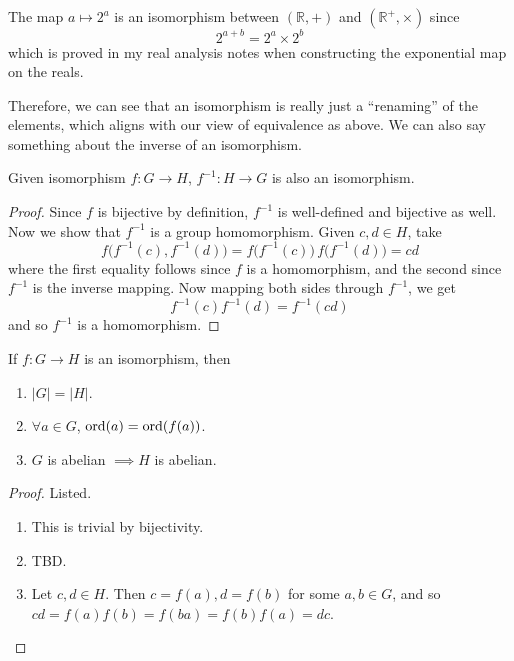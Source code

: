   \begin{example}
    The map $a \mapsto 2^{a}$ is an isomorphism between $(\mathbb{R}, +)$ and $(\mathbb{R}^{+}, \times)$ since 
    \begin{equation}
      2^{a+b} = 2^a \times 2^b
    \end{equation} 
    which is proved in my real analysis notes when constructing the exponential map on the reals. 
  \end{example} 

  Therefore, we can see that an isomorphism is really just a ``renaming'' of the elements, which aligns with our view of equivalence as above. We can also say something about the inverse of an isomorphism. 

  \begin{theorem}
    Given isomorphism $f: G \rightarrow H$, $f^{-1}: H \rightarrow G$ is also an isomorphism. 
  \end{theorem}
  \begin{proof}
    Since $f$ is bijective by definition, $f^{-1}$ is well-defined and bijective as well. Now we show that $f^{-1}$ is a group homomorphism. Given $c, d \in H$, take 
    \begin{equation}
      f \big( f^{-1} (c), f^{-1} (d)\big) = f \big( f^{-1} (c) \big) \, f \big( f^{-1} (d) \big) = cd 
    \end{equation}
    where the first equality follows since $f$ is a homomorphism, and the second since $f^{-1}$ is the inverse mapping. Now mapping both sides through $f^{-1}$, we get 
    \begin{equation}
      f^{-1} (c) f^{-1} (d) = f^{-1} (cd)
    \end{equation}
    and so $f^{-1}$ is a homomorphism. 
  \end{proof} 

  \begin{theorem}
    If $f: G \rightarrow H$ is an isomorphism, then 
    \begin{enumerate}
      \item $|G| = |H|$.
      \item $\forall a \in G$, $\ord(a) = \ord(f(a))$. 
      \item $G$ is abelian $\implies H$ is abelian. 
    \end{enumerate} 
  \end{theorem}
  \begin{proof}
    Listed. 
    \begin{enumerate}
      \item This is trivial by bijectivity. 
      \item TBD. 
      \item Let $c, d \in H$. Then $c = f(a), d = f(b)$ for some $a, b \in G$, and so $cd = f(a) f(b) = f(ba) = f(b) f(a) = dc$. 
    \end{enumerate}
  \end{proof}

